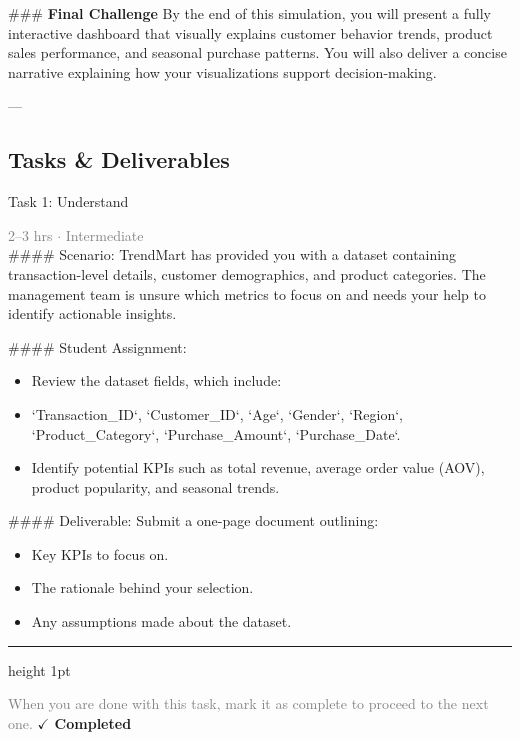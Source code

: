 \documentclass[10pt,a4paper]{article}
\begin{document}
\#\#\# \textbf{Final Challenge}
By the end of this simulation, you will present a fully interactive dashboard that visually explains customer behavior trends, product sales performance, and seasonal purchase patterns. You will also deliver a concise narrative explaining how your visualizations support decision-making.

---

\subsection*{Tasks \& Deliverables}

\begin{taskbox}{Task 1: Understand}

    {\small \textcolor{gray}{2--3 hrs $\cdot$ Intermediate}}\\[12pt]

    \#\#\#\# Scenario:
TrendMart has provided you with a dataset containing transaction-level details, customer demographics, and product categories. The management team is unsure which metrics to focus on and needs your help to identify actionable insights.

\#\#\#\# Student Assignment:
\begin{itemize}
    \item Review the dataset fields, which include:
    \item `Transaction\_ID`, `Customer\_ID`, `Age`, `Gender`, `Region`, `Product\_Category`, `Purchase\_Amount`, `Purchase\_Date`.
    \item Identify potential KPIs such as total revenue, average order value (AOV), product popularity, and seasonal trends.
\end{itemize}

\#\#\#\# Deliverable:
Submit a one-page document outlining:
\begin{itemize}
    \item Key KPIs to focus on.
    \item The rationale behind your selection.
    \item Any assumptions made about the dataset.\par
\end{itemize}

    \vspace{16pt}

    \textcolor{cardBorder}{\hrule height 1pt}\vspace{8pt}

    \small \textcolor{gray}{When you are done with this task, mark it as complete to proceed to the next one.} \hfill \textbf{\textcolor{brandDark}{$\checkmark$ Completed}}

\end{taskbox}
\end{document}
